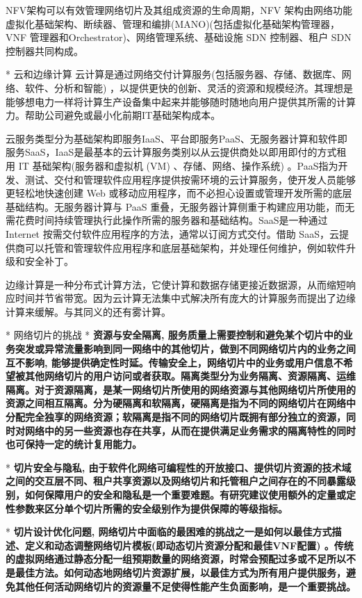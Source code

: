         NFV架构可以有效管理网络切片及其组成资源的生命周期，NFV 架构由网络功能虚拟化基础架构、断续器、管理和编排(MANO)(包括虚拟化基础架构管理器，VNF 管理器和Orchestrator)、网络管理系统、基础设施 SDN 控制器、租户 SDN 控制器共同构成。

    * 云和边缘计算
        云计算是通过网络交付计算服务(包括服务器、存储、数据库、网络、软件、分析和智能) ，以提供更快的创新、灵活的资源和规模经济。其理想是能够想电力一样将计算生产设备集中起来并能够随时随地向用户提供其所需的计算力。帮助公司避免或最小化前期IT基础架构成本。

        云服务类型分为基础架构即服务IaaS、平台即服务PaaS、无服务器计算和软件即服务SaaS，IaaS是最基本的云计算服务类别以从云提供商处以即用即付的方式租用 IT 基础架构(服务器和虚拟机 (VM) 、存储、网络、操作系统) 。PaaS指为开发、测试、交付和管理软件应用程序提供按需环境的云计算服务，使开发人员能够更轻松地快速创建 Web 或移动应用程序，而不必担心设置或管理开发所需的底层基础结构。无服务器计算与 PaaS 重叠，无服务器计算侧重于构建应用功能，而无需花费时间持续管理执行此操作所需的服务器和基础结构。SaaS是一种通过 Internet 按需交付软件应用程序的方法，通常以订阅方式交付。借助 SaaS，云提供商可以托管和管理软件应用程序和底层基础架构，并处理任何维护，例如软件升级和安全补丁。

        边缘计算是一种分布式计算方法，它使计算和数据存储更接近数据源，从而缩短响应时间并节省带宽。因为云计算无法集中式解决所有庞大的计算服务而提出了边缘计算来缓解。与其同义的还有雾计算。


* 网络切片的挑战
    * \bf{资源与安全隔离}, 服务质量上需要控制和避免某个切片中的业务突发或异常流量影响到同一网络中的其他切片，做到不同网络切片内的业务之间互不影响, 能够提供确定性时延。传输安全上，网络切片中的业务或用户信息不希望被其他网络切片的用户访问或者获取。隔离类型分为业务隔离、资源隔离、运维隔离。对于资源隔离，是某一网络切片所使用的网络资源与其他网络切片所使用的资源之间相互隔离。分为硬隔离和软隔离，硬隔离是指为不同的网络切片在网络中分配完全独享的网络资源；软隔离是指不同的网络切片既拥有部分独立的资源，同时对网络中的另一些资源也存在共享，从而在提供满足业务需求的隔离特性的同时也可保持一定的统计复用能力。

    * \bf{切片安全与隐私}, 由于软件化网络可编程性的开放接口、提供切片资源的技术域之间的交互层不同、租户共享资源以及网络切片和托管租户之间存在的不同暴露级别，如何保障用户的安全和隐私是一个重要难题。有研究建议使用额外的定量或定性参数来区分单个切片所需的安全级别作为提供保障的等级指标。

    * \bf{切片设计优化问题}, 网络切片中面临的最困难的挑战之一是如何以最佳方式描述、定义和动态调整网络切片模板(即动态切片资源分配和最佳VNF配置) 。传统的虚拟网络通过静态分配一组预期数量的网络资源，时常会预配过多或不足所以不是最佳方法。如何动态地网络切片资源扩展，以最佳方式为所有用户提供服务，避免其他任何活动网络切片的资源量不足使得性能产生负面影响，是一个重要挑战。

